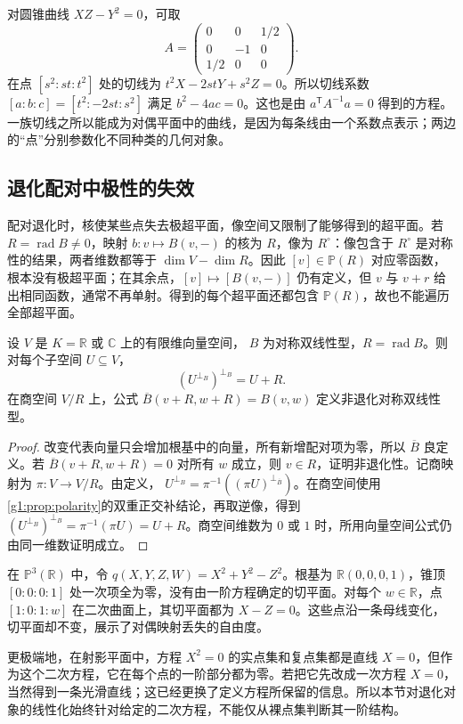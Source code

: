 \begin{example}\label{g1:exm:dual-conic}
	对圆锥曲线 \(XZ-Y^2=0\)，可取
	\[
		A=\begin{pmatrix}0&0&1/2\\0&-1&0\\1/2&0&0\end{pmatrix}.
	\]
	在点 \([s^2:st:t^2]\) 处的切线为 \(t^2X-2stY+s^2Z=0\)。所以切线系数 \([a:b:c]=[t^2:-2st:s^2]\) 满足 \(b^2-4ac=0\)。这也是由 \(a^{\mathsf T}A^{-1}a=0\) 得到的方程。一族切线之所以能成为对偶平面中的曲线，是因为每条线由一个系数点表示；两边的“点”分别参数化不同种类的几何对象。
\end{example}

\subsection{退化配对中极性的失效}
\label{g1:subsec:0204:04}

配对退化时，核使某些点失去极超平面，像空间又限制了能够得到的超平面。若 \(R=\operatorname{rad}B\ne0\)，映射 \(b:v\mapsto B(v,-)\) 的核为 \(R\)，像为 \(R^\circ\)：像包含于 \(R^\circ\) 是对称性的结果，两者维数都等于 \(\dim V-\dim R\)。因此 \([v]\in\mathbb P(R)\) 对应零函数，根本没有极超平面；在其余点，\([v]\mapsto[B(v,-)]\) 仍有定义，但 \(v\) 与 \(v+r\) 给出相同函数，通常不再单射。得到的每个超平面还都包含 \(\mathbb P(R)\)，故也不能遍历全部超平面。

\begin{proposition}\label{g1:prop:degenerate-polarity}
	设 \(V\) 是 \(K=\mathbb R\) 或 \(\mathbb C\) 上的有限维向量空间， \(B\) 为对称双线性型，\(R=\operatorname{rad}B\)。则对每个子空间 \(U\subseteq V\)，
	\[
		(U^{\perp_B})^{\perp_B}=U+R.
	\]
	在商空间 \(V/R\) 上，公式 \(\overline B(v+R,w+R)=B(v,w)\) 定义非退化对称双线性型。
\end{proposition}
\begin{proof}
	改变代表向量只会增加根基中的向量，所有新增配对项为零，所以 \(\overline B\) 良定义。若 \(\overline B(v+R,w+R)=0\) 对所有 \(w\) 成立，则 \(v\in R\)，证明非退化性。记商映射为 \(\pi:V\rightarrow V/R\)。由定义， \(U^{\perp_B}=\pi^{-1}((\pi U)^{\perp_{\overline B}})\)。在商空间使用\cref{g1:prop:polarity}的双重正交补结论，再取逆像，得到 \((U^{\perp_B})^{\perp_B}=\pi^{-1}(\pi U)=U+R\)。商空间维数为 \(0\) 或 \(1\) 时，所用向量空间公式仍由同一维数证明成立。
\end{proof}

\begin{example}\label{g1:exm:singular-polarity}
	在 \(\mathbb P^3(\mathbb R)\) 中，令 \(q(X,Y,Z,W)=X^2+Y^2-Z^2\)。根基为 \(\mathbb R(0,0,0,1)\)，锥顶 \([0:0:0:1]\) 处一次项全为零，没有由一阶方程确定的切平面。对每个 \(w\in\mathbb R\)，点 \([1:0:1:w]\) 在二次曲面上，其切平面都为 \(X-Z=0\)。这些点沿一条母线变化，切平面却不变，展示了对偶映射丢失的自由度。
\end{example}

更极端地，在射影平面中，方程 \(X^2=0\) 的实点集和复点集都是直线 \(X=0\)，但作为这个二次方程，它在每个点的一阶部分都为零。若把它先改成一次方程 \(X=0\)，当然得到一条光滑直线；这已经更换了定义方程所保留的信息。所以本节对退化对象的线性化始终针对给定的二次方程，不能仅从裸点集判断其一阶结构。

